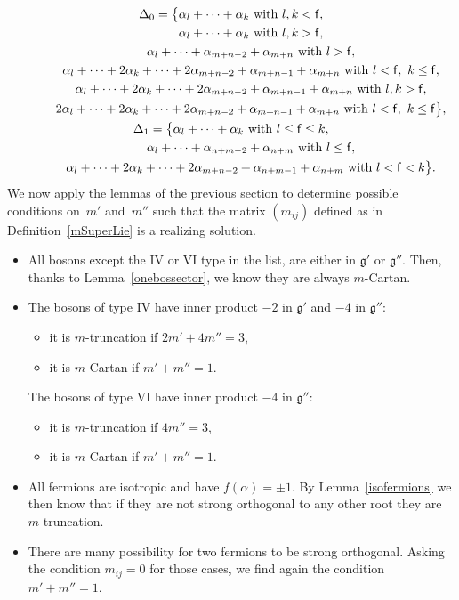 \documentclass[10pt,a4paper]{amsart}
\numberwithin{equation}{section}
\newcommand{\f}{\mathsf{f}}
\begin{document}
\begin{gather*}
\Delta_0 =  \big\lbrace \alpha_l+ \dots +\alpha_k \ \text{with } l,k<\f,  \\
\hphantom{\Delta_0 =  \big\lbrace}{}  \alpha_l+ \dots +\alpha_k \ \text{with } l,k > \f, \\
\hphantom{\Delta_0 =  \big\lbrace}{}\alpha_l+ \dots +\alpha_{m+n-2}+\alpha_{m+n} \ \text{with } l > \f,\\
\hphantom{\Delta_0 =  \big\lbrace}{}\alpha_l+ \dots +2\alpha_{k}+\dots +2\alpha_{m+n-2} +\alpha_{m+n-1}+\alpha_{m+n} \ \text{with } l < \f, \  k\leq \f,\\
\hphantom{\Delta_0 =  \big\lbrace}{}\alpha_l+ \dots +2\alpha_{k}+\dots +2\alpha_{m+n-2} +\alpha_{m+n-1}+\alpha_{m+n} \ \text{with } l,k > \f, \\
\hphantom{\Delta_0 =  \big\lbrace}{}2\alpha_l+ \dots +2\alpha_{k}+\dots +2\alpha_{m+n-2} +\alpha_{m+n-1}+\alpha_{m+n} \ \text{with } l < \f,\  k\leq \f\big\rbrace,\\
\Delta_1 =  \big\lbrace \alpha_l+ \dots +\alpha_{k} \ \text{with } l\leq \f \leq k,\\
\hphantom{\Delta_1 =  \big\lbrace}{}
\alpha_l+ \dots +\alpha_{n+m-2}+\alpha_{n+m} \ \text{with } l\leq \f, \\
\hphantom{\Delta_1 =  \big\lbrace}{} \alpha_l+ \dots +2\alpha_{k}+\dots +2\alpha_{m+n-2}+\alpha_{n+m-1}+\alpha_{n+m} \ \text{with } l < \f<k\big\rbrace.
\end{gather*}
We now apply the lemmas of the previous section to determine possible conditions on~$m'$ and~$m''$ such that the matrix $(m_{ij})$ defined as in Definition~\ref{mSuperLie} is a realizing solution.
\begin{itemize}\itemsep=0pt
	\item All bosons except the IV or VI type in the list, are either in $\mathfrak{g'}$ or $\mathfrak{g''}$. Then, thanks to Lemma~\ref{onebossector}, we know they are always $m$-Cartan.
	\item The bosons of type IV have inner product $-2$ in $\mathfrak{g'}$ and $-4$ in $\mathfrak{g''}$:
	\begin{itemize}\itemsep=0pt
		\item it is $m$-truncation if $2m' +4m'' =3$,
	\item it is $m$-Cartan if $m'+m'' = 1$.
	\end{itemize}
	 The bosons of type VI have inner product $-4$ in $\mathfrak{g''}$:
	\begin{itemize}\itemsep=0pt
		\item it is $m$-truncation if $4m'' =3$,
	\item it is $m$-Cartan if $m'+m'' = 1$.
	\end{itemize}
	\item All fermions are isotropic and have $f(\alpha)= \pm 1$. By Lemma~\ref{isofermions} we then know that if they are not strong orthogonal to any other root they are $m$-truncation.
	\item There are many possibility for two fermions to be strong orthogonal. Asking the condition $m_{ij} = 0$ for those cases, we find again the condition $m' + m'' = 1$.
\end{itemize}
\end{document}

